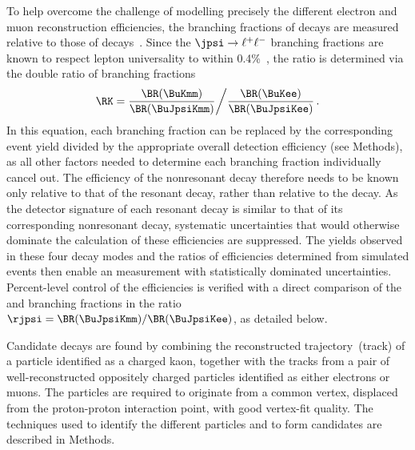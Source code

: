 To help overcome the challenge of modelling precisely the different electron and muon reconstruction efficiencies, the branching fractions of \BuKll decays are measured relative to those of \BuJpsiK decays~\cite{LHCb-PAPER-2014-024}. Since the $\jpsi\to\ell^+\ell^-$ branching fractions are known to respect lepton universality to within 0.4\%~\cite{Ablikim:2013pqa,PDG2020}, the \RK ratio is determined via the double ratio of branching fractions
    \begin{equation}
    \label{eq:doubleratio}
       \RK = {\frac{\BR(\BuKmm)}{\BR(\BuJpsiKmm)}} \bigg{/} {\frac{\BR(\BuKee)}{\BR(\BuJpsiKee)}} \, .
    \end{equation}
\noindent In this equation, each branching fraction can be replaced by the corresponding event yield divided by the appropriate overall detection efficiency (see Methods), as all other factors needed to determine each branching fraction individually cancel out. 
The efficiency of the nonresonant \BuKee decay therefore needs to be known only relative to that of the resonant \BuJpsiKee decay, rather than relative to the \BuKmm decay. 
As the detector signature of each resonant decay is similar to that of its corresponding nonresonant decay, systematic uncertainties that would otherwise dominate the calculation of these efficiencies are suppressed. The yields observed in these four decay modes and the ratios of efficiencies determined from simulated events then enable an \RK measurement with statistically dominated uncertainties. Percent-level control of the efficiencies is verified with a direct comparison of the \BuJpsiKee and \BuJpsiKmm branching fractions in the ratio \mbox{$\rjpsi=\BR(\BuJpsiKmm)/\BR(\BuJpsiKee)$}, as detailed below. 

Candidate \BuKll decays are found by combining the reconstructed trajectory~(track) of a particle identified as a charged kaon, together with the tracks from a pair of well-reconstructed oppositely charged particles identified as either electrons or muons. The particles are required to originate from a common vertex, displaced from the proton-proton interaction point, with good vertex-fit quality. The techniques used to identify the different particles and to form \Bp candidates are described in Methods. 


